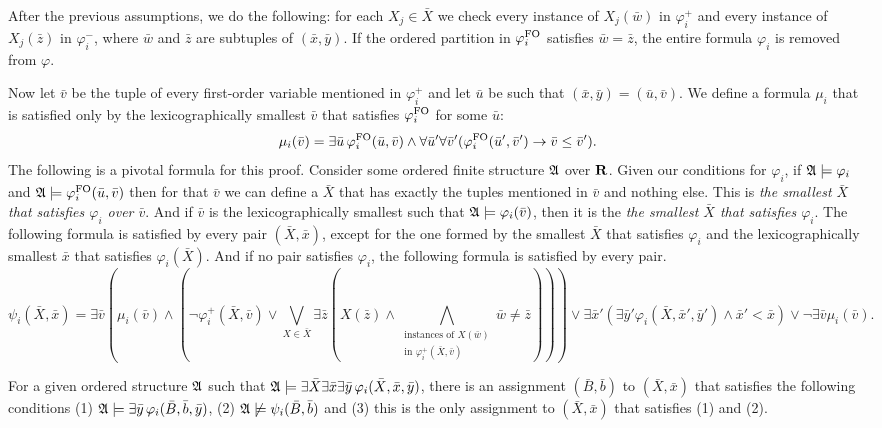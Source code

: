 After the previous assumptions, we do the following: for each $X_j\in \bar{X}$ we check every instance of $X_j(\bar{w})$ in $\varphi^{+}_i$ and every instance of $X_j(\bar{z})$ in $\varphi^{-}_i$, where $\bar{w}$ and $\bar{z}$ are subtuples of $(\bar{x},\bar{y})$. If the ordered partition in $\varphi^{{\rm FO}}_i$ satisfies $\bar{w} = \bar{z}$, the entire formula $\varphi_i$ is removed from $\varphi$.

Now let $\bar{v}$ be the tuple of every first-order variable mentioned in $\varphi_i^{+}$ and let $\bar{u}$ be such that $(\bar{x},\bar{y}) = (\bar{u},\bar{v})$. We define a formula $\mu_i$ that is satisfied only by the lexicographically smallest $\bar{v}$ that satisfies $\varphi_i^{{\rm FO}}$ for some $\bar{u}$:
$$
\mu_i(\bar{v}) = \exists\bar{u}\,\varphi_i^{{\rm FO}}(\bar{u},\bar{v})\wedge\forall\bar{u}'\forall\bar{v}'(\varphi_i^{{\rm FO}}(\bar{u}',\bar{v}')\to\bar{v}\leq\bar{v}').
$$
The following is a pivotal formula for this proof. Consider some ordered finite structure $\mathfrak{A}$ over $\mathbf{R}$. Given our conditions for $\varphi_i$, if $\mathfrak{A}\models\varphi_i$ and $\mathfrak{A}\models\varphi^{{\rm FO}}_i(\bar{u},\bar{v})$ then for that $\bar{v}$ we can define a $\bar{X}$ that has exactly the tuples mentioned in $\bar{v}$ and nothing else. This is {\em the smallest $\bar{X}$ that satisfies $\varphi_i$ over $\bar{v}$}. And if $\bar{v}$ is the lexicographically smallest such that $\mathfrak{A}\models\varphi_i(\bar{v})$, then it is the {\em the smallest $\bar{X}$ that satisfies $\varphi_i$}. The following formula is satisfied by every pair $(\bar{X},\bar{x})$, except for the one formed by the smallest $\bar{X}$ that satisfies $\varphi_i$ and the lexicographically smallest $\bar{x}$ that satisfies $\varphi_i(\bar{X})$. And if no pair satisfies $\varphi_i$, the following formula is satisfied by every pair.
$$
\psi_i(\bar{X},\bar{x}) = \exists\bar{v}(\mu_i(\bar{v})\wedge(\neg\varphi^{+}_i(\bar{X},\bar{v})\vee\bigvee_{X \in \bar{X}} \exists\bar{z}(X(\bar{z}) \wedge \bigwedge\limits_{\substack{\text{instances of }X(\bar{w}) \\ \text{in }\varphi^{+}_i(\bar{X},\bar{v})}}\bar{w}\neq\bar{z}))) \vee \exists\bar{x}'(\exists\bar{y}'\varphi_i(\bar{X},\bar{x}',\bar{y}')\wedge \bar{x}'<\bar{x})\vee\neg\exists\bar{v}\mu_i(\bar{v}) .
$$
\begin{lemma}
	For a given ordered structure $\mathfrak{A}$ such that $\mathfrak{A}\models\exists\bar{X}\exists\bar{x}\exists\bar{y}\,\varphi_i(\bar{X},\bar{x},\bar{y})$, there is an assignment $(\bar{B},\bar{b})$ to $(\bar{X},\bar{x})$ that satisfies the following conditions (1) $\mathfrak{A}\models\exists\bar{y}\,\varphi_i(\bar{B},\bar{b},\bar{y})$, (2) $\mathfrak{A}\not\models\psi_i(\bar{B},\bar{b})$ and (3) this is the only assignment to $(\bar{X},\bar{x})$ that satisfies (1) and (2).
\end{lemma}
